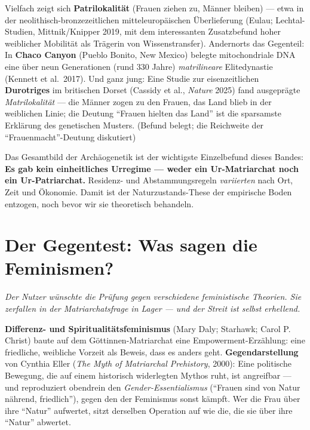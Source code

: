 \documentclass[11pt,a4paper,ngerman]{scrartcl}
\newcommand{\chipbase}[2]{\hspace{0pt}{\footnotesize\textcolor{#1}{[\textsc{#2}]}}}
\newcommand{\chipbelegt}[1]{\chipbase{chipgreen}{#1}}
\newcommand{\chipplausibel}[1]{\chipbase{chipamber}{#1}}
\begin{document}
Vielfach zeigt sich \textbf{Patrilokalität} (Frauen ziehen zu, Männer bleiben) --- etwa in der neolithisch-bronzezeitlichen mitteleuropäischen Überlieferung (Eulau; Lechtal-Studien, Mittnik/Knipper 2019, mit dem interessanten Zusatzbefund hoher weiblicher Mobilität als Trägerin von Wissenstransfer). \chipbelegt{belegt} Andernorts das Gegenteil: In \textbf{Chaco Canyon} (Pueblo Bonito, New Mexico) belegte mitochondriale DNA eine über neun Generationen (rund 330 Jahre) \emph{matrilineare} Elitedynastie (Kennett et al.\ 2017). \chipbelegt{belegt} Und ganz jung: Eine Studie zur eisenzeitlichen \textbf{Durotriges} im britischen Dorset (Cassidy et al., \emph{Nature} 2025) fand ausgeprägte \emph{Matrilokalität} --- die Männer zogen zu den Frauen, das Land blieb in der weiblichen Linie; die Deutung \enquote{Frauen hielten das Land} ist die sparsamste Erklärung des genetischen Musters. \chipplausibel{plausibel} (Befund belegt; die Reichweite der \enquote{Frauenmacht}-Deutung diskutiert)

Das Gesamtbild der Archäogenetik ist der wichtigste Einzelbefund dieses Bandes: \textbf{Es gab kein einheitliches Urregime --- weder ein Ur-Matriarchat noch ein Ur-Patriarchat.} Residenz- und Abstammungsregeln \emph{variierten} nach Ort, Zeit und Ökonomie. Damit ist der Naturzustands-These der empirische Boden entzogen, noch bevor wir sie theoretisch behandeln. \chipbelegt{belegt}

\section{Der Gegentest: Was sagen die Feminismen?}
\noindent\textit{Der Nutzer wünschte die Prüfung gegen verschiedene feministische Theorien. Sie zerfallen in der Matriarchatsfrage in Lager --- und der Streit ist selbst erhellend.}
\medskip

\textbf{Differenz- und Spiritualitätsfeminismus} (Mary Daly; Starhawk; Carol P. Christ) baute auf dem Göttinnen-Matriarchat eine Empowerment-Erzählung: eine friedliche, weibliche Vorzeit als Beweis, dass es anders geht. \textbf{Gegendarstellung} von Cynthia Eller (\emph{The Myth of Matriarchal Prehistory}, 2000): Eine politische Bewegung, die auf einem historisch widerlegten Mythos ruht, ist angreifbar --- und reproduziert obendrein den \emph{Gender-Essentialismus} (\enquote{Frauen sind von Natur nährend, friedlich}), gegen den der Feminismus sonst kämpft. Wer die Frau über ihre \enquote{Natur} aufwertet, sitzt derselben Operation auf wie die, die sie über ihre \enquote{Natur} abwertet. \chipbelegt{belegt}
\end{document}
